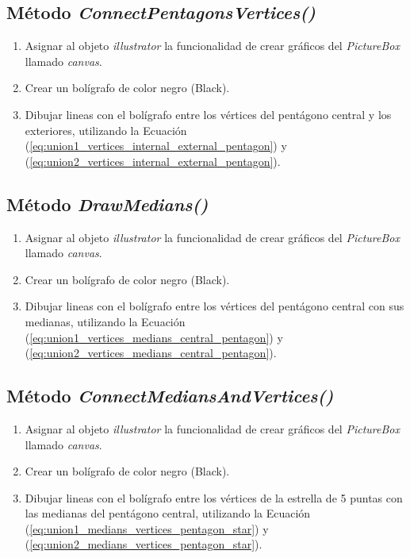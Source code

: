 \documentclass[oneside, a4paper]{article}
\begin{document}
        \subsection{Método \textit{ConnectPentagonsVertices()}}

            \begin{enumerate}
                \item Asignar al objeto \textit{illustrator} la funcionalidad de crear gráficos del \textit{PictureBox} llamado \textit{canvas}.
                \item Crear un bolígrafo de color negro (Black).
                \item Dibujar lineas con el bolígrafo entre los vértices del pentágono central y los exteriores, utilizando la Ecuación (\ref{eq:union1_vertices_internal_external_pentagon}) y (\ref{eq:union2_vertices_internal_external_pentagon}).
            \end{enumerate}

        \subsection{Método \textit{DrawMedians()}}

            \begin{enumerate}
                \item Asignar al objeto \textit{illustrator} la funcionalidad de crear gráficos del \textit{PictureBox} llamado \textit{canvas}.
                \item Crear un bolígrafo de color negro (Black).
                \item Dibujar lineas con el bolígrafo entre los vértices del pentágono central con sus medianas, utilizando la Ecuación (\ref{eq:union1_vertices_medians_central_pentagon}) y (\ref{eq:union2_vertices_medians_central_pentagon}).
            \end{enumerate}

        \subsection{Método \textit{ConnectMediansAndVertices()}}

            \begin{enumerate}
                \item Asignar al objeto \textit{illustrator} la funcionalidad de crear gráficos del \textit{PictureBox} llamado \textit{canvas}.
                \item Crear un bolígrafo de color negro (Black).
                \item Dibujar lineas con el bolígrafo entre los vértices de la estrella de 5 puntas con las medianas del pentágono central, utilizando la Ecuación (\ref{eq:union1_medians_vertices_pentagon_star}) y (\ref{eq:union2_medians_vertices_pentagon_star}).
            \end{enumerate}
\end{document}
